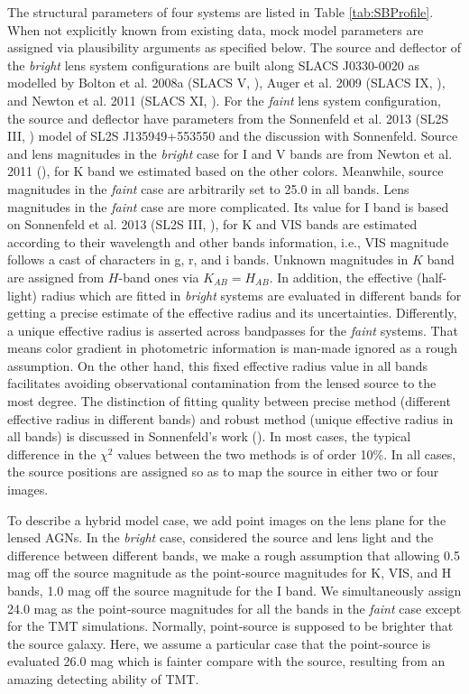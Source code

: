 \documentclass[a4paper,11pt]{article}
\begin{document}
The structural parameters of four systems are listed in Table \ref{tab:SBProfile}. When not explicitly known from existing data, mock model parameters are assigned via plausibility arguments as specified below. The source and deflector of the \textit{bright} lens system configurations are built along SLACS J0330-0020 as modelled by Bolton et al. 2008a (SLACS V, \cite{2008ApJ...682..964B}), Auger et al. 2009 (SLACS IX, \cite{2009ApJ...705.1099A}), and Newton et al. 2011 (SLACS XI, \cite{2011ApJ...734..104N}). For the \textit{faint} lens system configuration, the source and deflector have parameters from the Sonnenfeld et al. 2013 (SL2S III, \cite{2013ApJ...777...97S}) model of SL2S J135949+553550 and the discussion with Sonnenfeld. Source and lens magnitudes in the \textit{bright} case for I and V bands are from Newton et al. 2011 (\cite{2011ApJ...734..104N}), for K band we estimated based on the other colors. Meanwhile, source magnitudes in the \textit{faint} case are arbitrarily set to 25.0 in all bands. Lens magnitudes in the \textit{faint} case are more complicated. Its value for I band is based on Sonnenfeld et al. 2013 (SL2S III, \cite{2013ApJ...777...97S}), for K and VIS bands are estimated according to their wavelength and other bands information, i.e., VIS magnitude follows a cast of characters in g, r, and i bands. Unknown magnitudes in $K$ band are assigned from $H$-band ones via $K_{AB}=H_{AB}.$ In addition, the effective (half-light) radius which are fitted in \textit{bright} systems are evaluated in different bands for getting a precise estimate of the effective radius and its uncertainties. Differently, a unique effective radius is asserted across bandpasses for the \textit{faint} systems. That means color gradient in photometric information is man-made ignored as a rough assumption. On the other hand, this fixed effective radius value in all bands facilitates avoiding observational contamination from the lensed source to the most degree. The distinction of fitting quality between precise method (different effective radius in different bands) and robust method (unique effective radius in all bands) is discussed in Sonnenfeld's work (\cite{2013ApJ...777...97S}). In most cases, the typical difference in the $\chi^{2}$ values between the two methods is of order 10\%. In all cases, the source positions are assigned so as to map the source in either two or four images.

To describe a hybrid model case, we add point images on the lens plane for the lensed AGNs. In the \textit{bright} case, considered the source and lens light and the difference between different bands, we make a rough assumption that allowing 0.5 mag off the source magnitude as the point-source magnitudes for K, VIS, and H bands, 1.0 mag off the source magnitude for the I band. We simultaneously assign 24.0 mag as the point-source magnitudes for all the bands in the \textit{faint} case except for the TMT simulations. Normally, point-source is supposed to be brighter that the source galaxy. Here, we assume a particular case that the point-source is evaluated 26.0 mag which is fainter compare with the source, resulting from an amazing detecting ability of TMT.
\end{document}
